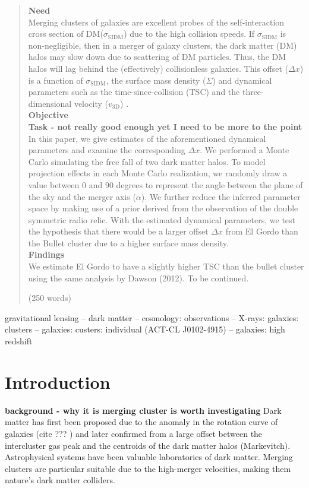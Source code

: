 \documentclass[useAMS,usenatbib]{mn2e}
\begin{document}
\begin{abstract}
\noindent\textbf{Need}\\
Merging clusters of galaxies are excellent probes of the self-interaction cross section of DM($\sigma_{\mathrm{SIDM}}$) due to the high collision speeds. If $\sigma_{\mathrm{SIDM}}$ is non-negligible, then in a merger of galaxy clusters, the dark matter (DM) halos may slow down due to scattering of DM particles. Thus, the DM halos will lag behind the (effectively) collisionless galaxies. This offset ($\Delta x$) is a function of $\sigma_{\mathrm{SIDM}}$, the surface mass density ($\Sigma$) and dynamical parameters such as the time-since-collision (TSC) and the three-dimensional velocity ($v_{\mathrm{3D}}$) .\\ 
\textbf{Objective}\\
\textbf{Task - not really good enough yet I need to be more to the point}\\
In this paper, we give estimates of the aforementioned dynamical parameters
 and examine the corresponding $\Delta x$. We performed a Monte Carlo simulating the free fall of two dark matter halos.
To model projection effects in each Monte Carlo realization, we randomly draw a value between 0 and 90 degrees to represent the angle between the plane of the sky and the merger axis ($\alpha$). We further reduce the inferred parameter space by making use of a prior derived from the observation of the double symmetric radio relic. With the estimated dynamical parameters, we test the hypothesis that there would be a larger offset $\Delta x$ from El Gordo than the Bullet cluster due to a higher surface mass density.\\ 
\textbf{Findings}\\ 
We estimate El Gordo to have a slightly higher TSC than the bullet cluster using the same analysis by Dawson (2012).  
To be continued.



(250 words)
	
\end{abstract}

\begin{keywords}

gravitational lensing -- dark matter -- cosmology: observations -- X-rays: galaxies: clusters -- galaxies: custers: individual (ACT-CL J0102-4915) -- galaxies: high redshift
\end{keywords}

\section{Introduction}
\textbf{background - why it is merging cluster is worth investigating}
Dark matter has first been proposed due to the anomaly in the rotation curve of galaxies (cite ??? ) and later confirmed from a large offset between the intercluster gas peak and the centroids of the dark matter halos (Markevitch).
Astrophysical systems have been valuable laboratories of dark matter.
Merging clusters are particular suitable due to the high-merger velocities, making them nature's dark matter colliders.
\end{document}
